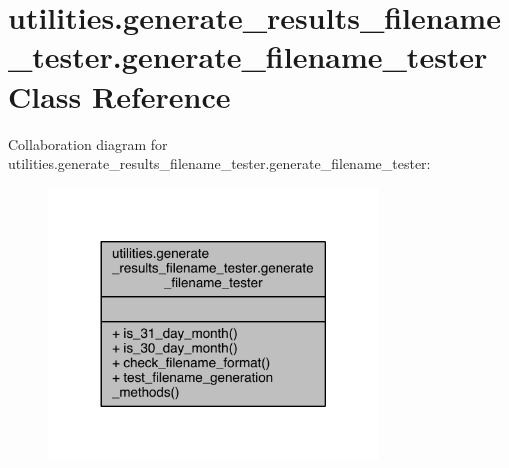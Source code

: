 \hypertarget{classutilities_1_1generate__results__filename__tester_1_1generate__filename__tester}{}\section{utilities.\+generate\+\_\+results\+\_\+filename\+\_\+tester.\+generate\+\_\+filename\+\_\+tester Class Reference}
\label{classutilities_1_1generate__results__filename__tester_1_1generate__filename__tester}


Collaboration diagram for utilities.\+generate\+\_\+results\+\_\+filename\+\_\+tester.\+generate\+\_\+filename\+\_\+tester\+:
\nopagebreak
\begin{figure}[H]
\begin{center}
\leavevmode
\includegraphics[width=248pt]{d6/d23/classutilities_1_1generate__results__filename__tester_1_1generate__filename__tester__coll__graph}
\end{center}
\end{figure}
